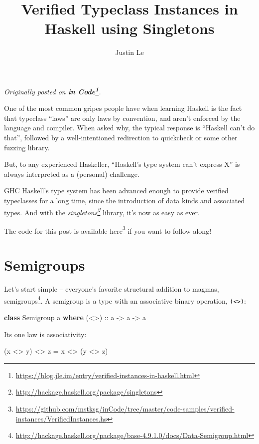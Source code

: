 \documentclass[]{article}
\title{Verified Typeclass Instances in Haskell using Singletons}
\author{Justin Le}
\newenvironment{Shaded}{}{}
\newcommand{\KeywordTok}[1]{\textcolor[rgb]{0.00,0.44,0.13}{\textbf{{#1}}}}
\newcommand{\DataTypeTok}[1]{\textcolor[rgb]{0.56,0.13,0.00}{{#1}}}
\newcommand{\OtherTok}[1]{\textcolor[rgb]{0.00,0.44,0.13}{{#1}}}
\newcommand{\FunctionTok}[1]{\textcolor[rgb]{0.02,0.16,0.49}{{#1}}}
\newcommand{\NormalTok}[1]{{#1}}
\renewcommand{\href}[2]{#2\footnote{\url{#1}}}
\begin{document}
\maketitle

\emph{Originally posted on
\textbf{\href{https://blog.jle.im/entry/verified-instances-in-haskell.html}{in
Code}}.}

One of the most common gripes people have when learning Haskell is the fact that
typeclass ``laws'' are only laws by convention, and aren't enforced by the
language and compiler. When asked why, the typical response is ``Haskell can't
do that'', followed by a well-intentioned redirection to quickcheck or some
other fuzzing library.

But, to any experienced Haskeller, ``Haskell's type system can't express X'' is
always interpreted as a (personal) challenge.

GHC Haskell's type system has been advanced enough to provide verified
typeclasses for a long time, since the introduction of data kinds and associated
types. And with the
\emph{\href{http://hackage.haskell.org/package/singletons}{singletons}} library,
it's now as easy as ever.

The code for this post is available
\href{https://github.com/mstksg/inCode/tree/master/code-samples/verified-instances/VerifiedInstances.hs}{here}
if you want to follow along!

\section{Semigroups}\label{semigroups}

Let's start simple -- everyone's favorite structural addition to magmas,
\href{http://hackage.haskell.org/package/base-4.9.1.0/docs/Data-Semigroup.html}{semigroups}.
A semigroup is a type with an associative binary operation,
\texttt{(\textless{}\textgreater{})}:

\begin{Shaded}
\begin{Highlighting}[]
\KeywordTok{class} \DataTypeTok{Semigroup} \NormalTok{a }\KeywordTok{where}
\OtherTok{    (<>) ::} \NormalTok{a }\OtherTok{->} \NormalTok{a }\OtherTok{->} \NormalTok{a}
\end{Highlighting}
\end{Shaded}

Its one law is associativity:

\begin{Shaded}
\begin{Highlighting}[]
\NormalTok{(x }\FunctionTok{<>} \NormalTok{y) }\FunctionTok{<>} \NormalTok{z }\FunctionTok{=} \NormalTok{x }\FunctionTok{<>} \NormalTok{(y }\FunctionTok{<>} \NormalTok{z)}
\end{Highlighting}
\end{Shaded}
\end{document}
